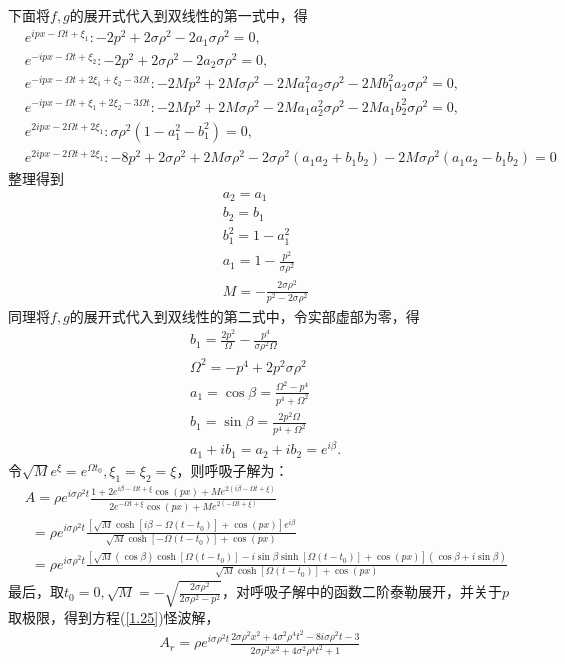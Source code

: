 下面将$f,g$的展开式代入到双线性的第一式中，得
\begin{align*}
& e^{ipx-\Omega t+\xi_1} : -2p^2+2\sigma\rho^2-2a_1\sigma\rho^2=0,\\
& e^{-ipx-\Omega t+\xi_2} : -2p^2+2\sigma\rho^2-2a_2\sigma\rho^2=0,\\
& e^{-ipx-\Omega t+2\xi_1+\xi_2-3\Omega t} : -2Mp^2+2M\sigma\rho^2-2Ma_1^2a_2\sigma\rho^2-2Mb_1^2a_2\sigma\rho^2=0,\\
& e^{-ipx-\Omega t+\xi_1+2\xi_2-3\Omega t} : -2Mp^2+2M\sigma\rho^2-2Ma_1a_2^2\sigma\rho^2-2Ma_1b_2^2\sigma\rho^2=0,\\
& e^{2ipx-2\Omega t+2\xi_1} : \sigma\rho^2(1-a_1^2-b_1^2)=0,\\
& e^{2ipx-2\Omega t+2\xi_1} : -8p^2+2\sigma\rho^2+2M\sigma\rho^2-2\sigma\rho^2(a_1a_2+b_1b_2)-2M\sigma\rho^2(a_1a_2-b_1b_2)=0
\end{align*}
整理得到
\begin{align*}
& a_2=a_1\\
& b_2=b_1\\
& b_1^2=1-a_1^2\\
& a_1=1-\frac{p^2}{\sigma\rho^2}\\
& M=-\frac{2\sigma\rho^2}{p^2-2\sigma\rho^2}
\end{align*}
同理将$f,g$的展开式代入到双线性的第二式中，令实部虚部为零，得
\begin{align*}
& b_1=\frac{2p^2}{\Omega}-\frac{p^4}{\sigma\rho^2\Omega}\\
& \Omega^2=-p^4+2p^2\sigma\rho^2\\
& a_1=\cos\beta=\frac{\Omega^2-p^4}{p^4+\Omega^2}\\
& b_1=\sin\beta=\frac{2p^2\Omega}{p^4+\Omega^2}\\
& a_1+ib_1=a_2+ib_2=e^{i\beta}.
\end{align*}
令$\sqrt{M}e^{\xi}=e^{\Omega t_0}, \xi_1=\xi_2=\xi$，则呼吸子解为：
\begin{align}
\nonumber
& A=\rho e^{i\sigma\rho^2t}\frac{1+2e^{i\beta-\Omega t+\xi}\cos(px)+Me^{2(i\beta-\Omega t+\xi)}}{2e^{-\Omega t+\xi}\cos(px)+Me^{2(-\Omega t+\xi)}}\\
\nonumber
& ~~=\rho e^{i\sigma\rho^2t}\frac{[\sqrt{M}\cosh{[i\beta-\Omega (t-t_0)]}+\cos(px)]e^{i\beta}}{\sqrt{M}\cosh{[-\Omega (t-t_0)]}+\cos(px)}\\
& ~~=\rho e^{i\sigma\rho^2t}\frac{[\sqrt{M}(\cos{\beta})\cosh{[\Omega (t-t_0)]}-i\sin\beta\sinh{[\Omega (t-t_0)]}+\cos(px)     ](\cos\beta+i\sin\beta)}{\sqrt{M}\cosh{[\Omega (t-t_0)]}+\cos(px)}
\end{align}
最后，取$t_0=0, \sqrt{M}=-\sqrt{\frac{2\sigma\rho^2}{2\sigma\rho^2-p^2}}$，对呼吸子解中的函数二阶泰勒展开，并关于$p$取极限，得到方程(\ref{1.25})怪波解，
\begin{align}
A_r=\rho e^{i\sigma\rho^2t}\frac{2\sigma\rho^2x^2+4\sigma^2\rho^4t^2-8i\sigma\rho^2t-3}{2\sigma\rho^2x^2+4\sigma^2\rho^4t^2+1}
\end{align}

